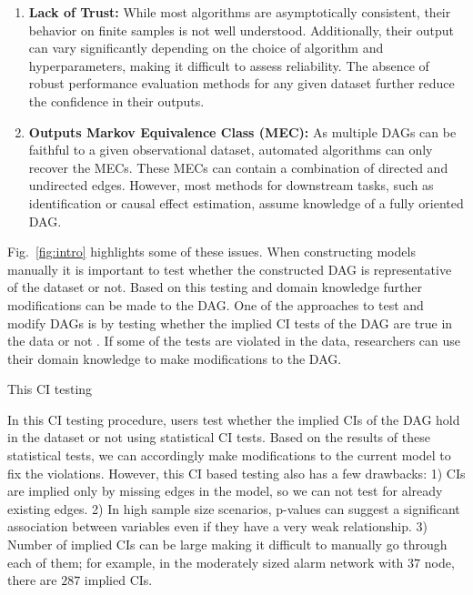 \documentclass{uai2025} %
\begin{document}
\begin{enumerate}
	\item \textbf{Lack of Trust:} While most algorithms are asymptotically
		consistent, their behavior on finite samples is not well
		understood. Additionally, their output can vary significantly
		depending on the choice of algorithm and hyperparameters,
		making it difficult to assess reliability. The absence of
		robust performance evaluation methods for any given dataset
		further reduce the confidence in their outputs. 
	\item \textbf{Outputs Markov Equivalence Class (MEC):} As multiple
		DAGs can be faithful to a given observational dataset, automated 
		algorithms can only recover the MECs. These MECs can contain a
		combination of directed and undirected edges. However, most
		methods for downstream tasks, such as identification or causal
		effect estimation, assume knowledge of a fully oriented DAG. 
\end{enumerate}

Fig.~\ref{fig:intro} highlights some of these issues. When constructing models
manually it is important to test whether the constructed DAG is representative
of the dataset or not. Based on this testing and domain knowledge further
modifications can be made to the DAG. One of the approaches to test and modify
DAGs is by testing whether the implied CI tests of the DAG are true in the data
or not \citep{Ankan2021}. If some of the tests are violated in the data,
researchers can use their domain knowledge to make modifications to the DAG.

This CI testing 


In this CI testing procedure, users test whether the implied CIs of the DAG
hold in the dataset or not using statistical CI tests. Based on the results of
these statistical tests, we can accordingly make modifications to the current
model to fix the violations. However, this CI based testing also has a few
drawbacks: 1) CIs are implied only by missing edges in the model, so we can not
test for already existing edges. 2) In high sample size scenarios, p-values can
suggest a significant association between variables even if they have a very
weak relationship. 3) Number of implied CIs can be large making it difficult to
manually go through each of them; for example, in the moderately sized alarm
network with $ 37 $ node, there are $287$ implied CIs. 
\end{document}
